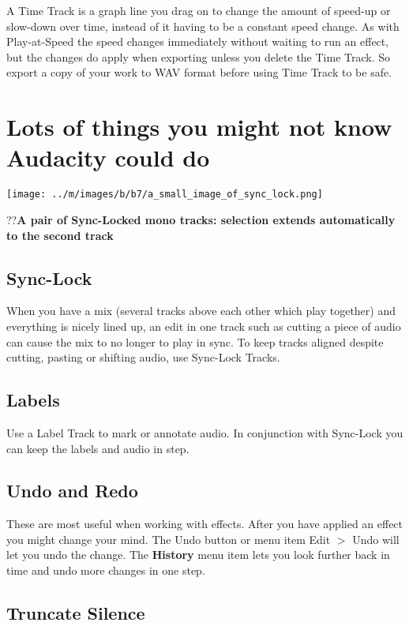 \documentclass[twocolumn]{book}
\begin{document}
A Time Track is a graph line you drag on to change the amount of speed-up or slow-down over time, instead of it having to be a constant speed change. As with Play-at-Speed the speed changes immediately without waiting to run an effect, but the changes do apply when exporting unless you delete the Time Track. So export a copy of your work to WAV format before using Time Track to be safe. 



\section{Lots of things you might not know Audacity could do}

\par\texttt{[image: ../m/images/b/b7/a\_small\_image\_of\_sync\_lock.png]}\par??\textbf{A pair of Sync-Locked mono tracks: selection extends automatically to the second track}

\subsection{Sync-Lock}


When you have a mix (several tracks above each other which play together) and everything is nicely lined up, an edit in one track such as cutting a piece of audio can cause the mix to no longer to play in sync. To keep tracks aligned despite cutting, pasting or shifting audio, use Sync-Lock Tracks.

\subsection{Labels}


Use a Label Track to mark or annotate audio.  In conjunction with Sync-Lock you can keep the labels and audio in step.

\subsection{Undo and Redo}


These are most useful when working with effects.  After you have applied an effect you might change your mind.  The Undo button or menu item Edit \mbox{$>$} Undo will let you undo the change. The \textbf{History} menu item lets you look further back in time and undo more changes in one step.

\subsection{Truncate Silence}
\end{document}
